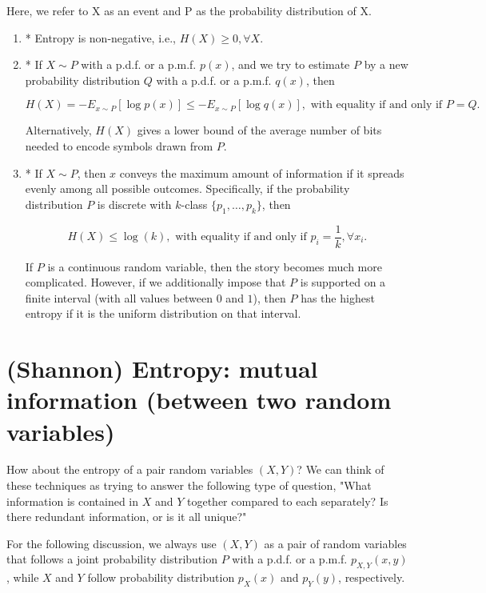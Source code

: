 Here, we refer to X as an event and P as the probability distribution of X.

\begin{enumerate}
  \item  * Entropy is non-negative, i.e., $H(X) \geq 0, \forall X$.

  \item * If $X \sim P$ with a p.d.f. or a p.m.f. $p(x)$, and we try to estimate
  $P$ by a new probability distribution $Q$ with a p.d.f. or a p.m.f. $q(x)$,
  then 
  
  $$H(X) = - E_{x \sim P} [\log p(x)] \leq  - E_{x \sim P} [\log q(x)], \text{ with equality if and only if } P = Q.$$  
  
  Alternatively, $H(X)$ gives a
  lower bound of the average number of bits needed to encode symbols drawn from
  $P$.
  
  \item * If $X \sim P$, then $x$ conveys the maximum amount of information if
  it spreads evenly among all possible outcomes. Specifically, if the
  probability distribution $P$ is discrete with $k$-class 
  $\{p_1, \ldots, p_k \}$, then 
  
  $$H(X) \leq \log(k), \text{ with equality if and only if } p_i =
  \frac{1}{k}, \forall x_i.$$ 
  
  If $P$ is a continuous random variable, then the
  story becomes much more complicated.  However, if we additionally impose that
  $P$ is supported on a finite interval (with all values between $0$ and $1$),
  then $P$ has the highest entropy if it is the uniform distribution on that
  interval.
  
  
\end{enumerate}


\section{(Shannon) Entropy: mutual information (between two  random variables)}

How about the entropy of a pair random variables $(X, Y)$?  We can think of
these techniques as trying to answer the following type of question, "What
information is contained in $X$ and $Y$ together compared to each separately? 
Is there redundant information, or is it all unique?"


For the following discussion, we always use $(X, Y)$ as a pair of random
variables that follows a joint probability distribution $P$ with a p.d.f. or a
p.m.f. $p_{X, Y}(x, y)$, while $X$ and $Y$ follow probability distribution
$p_X(x)$ and $p_Y(y)$, respectively.


